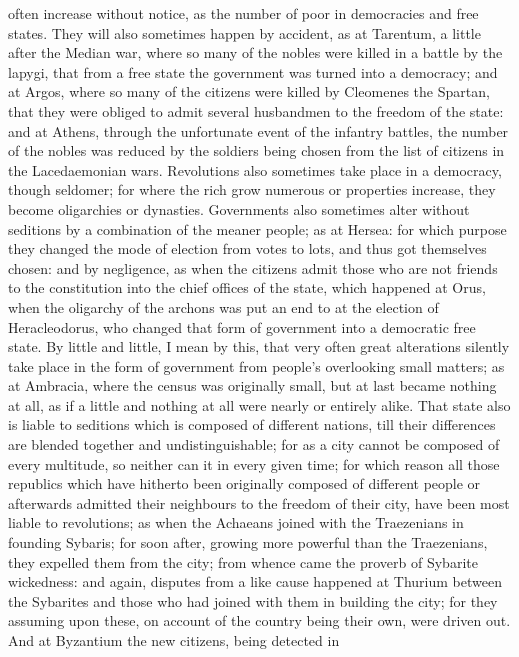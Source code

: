often increase without notice, as the number of poor in democracies and
free states. They will also sometimes happen by accident, as at Tarentum,
a little after the Median war, where so many of the nobles were killed in
a battle by the lapygi, that from a free state the government was turned
into a democracy; and at Argos, where so many of the citizens were killed
by Cleomenes the Spartan, that they were obliged to admit several
husbandmen to the freedom of the state: and at Athens, through the
unfortunate event of the infantry battles, the number of the nobles was
reduced by the soldiers being chosen from the list of citizens in the
Lacedaemonian wars. Revolutions also sometimes take place in a democracy,
though seldomer; for where the rich grow numerous or properties increase,
they become oligarchies or dynasties. Governments also sometimes alter
without seditions by a combination of the meaner people; as at Hersea: for
which purpose they changed the mode of election from votes to lots, and
thus got themselves chosen: and by negligence, as when the citizens admit
those who are not friends to the constitution into the chief offices of
the state, which happened at Orus, when the oligarchy of the archons was
put an end to at the election of Heracleodorus, who changed that form of
government into a democratic free state. By little and little, I mean by
this, that very often great alterations silently take place in the form of
government from people's overlooking small matters; as at Ambracia, where
the census was originally small, but at last became nothing at all, as if
a little and nothing at all were nearly or entirely alike. That state also
is liable to seditions which is composed of different nations, till their
differences are blended together and undistinguishable; for as a city
cannot be composed of every multitude, so neither can it in every given
time; for which reason all those republics which have hitherto been
originally composed of different people or afterwards admitted their
neighbours to the freedom of their city, have been most liable to
revolutions; as when the Achaeans joined with the Traezenians in founding
Sybaris; for soon after, growing more powerful than the Traezenians, they
expelled them from the city; from whence came the proverb of Sybarite
wickedness: and again, disputes from a like cause happened at Thurium
between the Sybarites and those who had joined with them in building the
city; for they assuming upon these, on account of the country being their
own, were driven out. And at Byzantium the new citizens, being detected in
